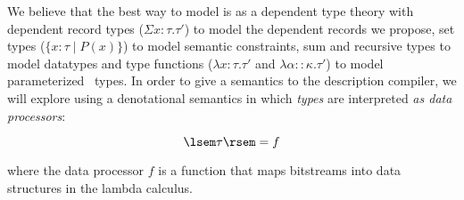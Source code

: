 \documentclass[11pt]{article}
\begin{document}
We believe that the best way to model \datatype{} is as a dependent
type theory with dependent record types ($\Sigma x{:}\tau.\tau'$) to model
the dependent records we propose, set types 
($\{x{:}\tau \; | \; P(x) \}$) to model
semantic constraints, sum and recursive types to model
datatypes and type functions
($\lambda x{:}\tau.\tau'$ and $\lambda \alpha{::}\kappa.\tau'$) 
to model parameterized \pads{}\ types.  
In order to give a semantics to the \datatype{} description
compiler, we will explore using
a denotational semantics in which {\em types} are interpreted 
{\em as data processors}:

\[
\lsem \tau \rsem = f
\]

\noindent
where the data processor $f$ is a function that maps bitstreams into 
data structures in the lambda calculus. 


\end{document}
